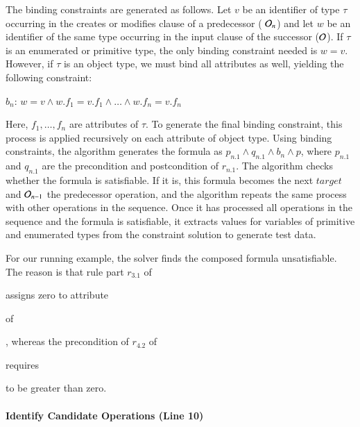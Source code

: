 The binding constraints are generated as follows. Let $v$ be an identifier of
type $\tau$ occurring in the creates or modifies clause of a predecessor (\eg
${\cal O}_n$) and let $w$ be an identifier of the same type occurring in the
input clause of the successor (\eg ${\cal O}$). If $\tau$ is an enumerated or
primitive type, the only binding constraint needed is $w = v$. However, if
$\tau$ is an object type, we must bind all attributes as well, yielding the
following constraint:

\vskip 2pt
$b_n$: $w = v \wedge w.f_1 = v.f_1 \wedge \ldots \wedge w.f_n = v.f_n$ 
\vskip 2pt

Here, $f_1, \ldots , f_n$ are attributes of $\tau$. To generate the final
binding constraint, this process is applied recursively on each attribute of
object type. Using binding constraints, the algorithm generates the formula as
$p_{n.1} \wedge q_{n.1} \wedge b_n \wedge p$, where $p_{n.1}$ and $q_{n.1}$ are
the precondition and postcondition of $r_{n.1}$. The algorithm checks whether
the formula is satisfiable.  If it is, this formula becomes the next $target$
and ${\cal O}_{n-1}$ the predecessor operation, and the algorithm repeats the
same process with other operations in the sequence.  Once it has processed all
operations in the sequence and the formula is satisfiable, it extracts values
for variables of primitive and enumerated types from the constraint solution to
generate test data.

For our running example, the solver finds the composed formula
unsatisfiable. The reason is that rule part $r_{3.1}$ of \subject{CreateOrder}
assigns zero to attribute \subject{total} of \subject{Order}, whereas the
precondition of $r_{4.2}$ of \subject{GenerateInvoice} requires \subject{total}
to be greater than zero.



\paragraph*{Identify Candidate Operations (Line 10)}

